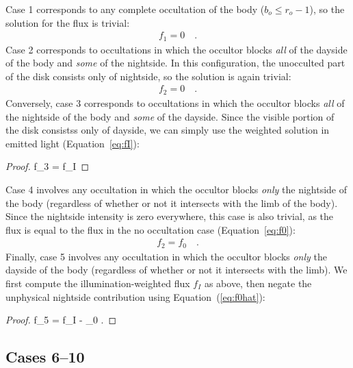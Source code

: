 \documentclass[modern]{aastex62}
\begin{document}
Case 1 corresponds to any complete occultation of the body
($b_o \le r_o - 1$), so the solution for the flux is trivial:
%
\begin{align}
    \label{eq:f1}
    f_1 = 0
    \quad.
\end{align}
%
Case 2 corresponds to occultations in which the occultor blocks \emph{all} of
the dayside of the body and \emph{some} of the nightside. In this
configuration, the unocculted part of the disk consists only of nightside, so
the solution is again trivial:
%
\begin{align}{}
    \label{eq:f2}
    f_2 = 0
    \quad.
\end{align}
%
Conversely, case 3 corresponds to occultations in which the occultor blocks
\emph{all} of the nightside of the body and \emph{some} of the dayside.
Since the visible portion of the disk consistss only of dayside, we can
simply use the weighted solution in emitted light
(Equation~\ref{eq:fI}):
%
\begin{proof}{}
    \label{eq:f3}
    f_3 = f_I
\end{proof}
%
Case 4 involves any occultation in which the occultor blocks \emph{only} the
nightside of the body (regardless of whether or not it intersects with the
limb of the body). Since the nightside intensity is zero everywhere, this case
is also trivial, as the flux is equal to the flux in the no occultation case
(Equation~\ref{eq:f0}):
%
\begin{align}
    \label{eq:f4}
    f_2 = f_0
    \quad.
\end{align}
%
Finally, case 5 involves any occultation in which the occultor blocks
\emph{only} the dayside of the body (regardless of whether or not it
intersects with the limb). We first compute the illumination-weighted flux
$f_I$ as above, then negate the unphysical nightside contribution
using Equation~(\ref{eq:f0hat}):
%
\begin{proof}{}
    \label{eq:f5}
    f_5 = f_I - _0
    \quad.
\end{proof}

%

\subsection{Cases 6--10}
\label{sec:cases-hard}
%
\end{document}
